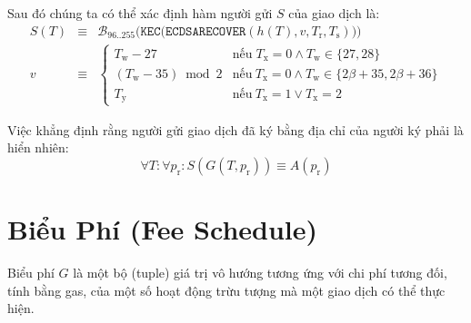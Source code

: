 \documentclass[9pt,oneside]{amsart}
\begin{document}
Sau đó chúng ta có thể xác định hàm người gửi $S$ của giao dịch là:
\begin{eqnarray}
S(T) &\equiv& \mathcal{B}_{96..255}\big(\mathtt{KEC}\big( \mathtt{ECDSARECOVER}(h(T), v, T_{\mathrm{r}}, T_{\mathrm{s}}) \big) \big) \\
v &\equiv& \begin{cases}
T_{\mathrm{w}} - 27 & \text{nếu} \; T_{\mathrm{x}} = 0 \land T_{\mathrm{w}} \in \{27, 28\} \\
(T_{\mathrm{w}}-35) \bmod 2 & \text{nếu} \ T_{\mathrm{x}} = 0 \land T_{\mathrm{w}} \in \{2\beta + 35, 2\beta + 36\} \\
T_{\mathrm{y}} & \text{nếu} \ T_{\mathrm{x}} = 1 \lor T_{\mathrm{x}} = 2
\end{cases}
\end{eqnarray}

Việc khẳng định rằng người gửi giao dịch đã ký bằng địa chỉ của người ký phải là hiển nhiên:
\begin{equation}
\forall T: \forall p_{\mathrm{r}}: S(G(T, p_{\mathrm{r}})) \equiv A(p_{\mathrm{r}})
\end{equation}

\section{Biểu Phí (Fee Schedule)}\label{app:fees}

\nopagebreak
Biểu phí $G$ là một bộ (tuple) giá trị vô hướng tương ứng với chi phí tương đối, tính bằng gas, của một số hoạt động trừu tượng mà một giao dịch có thể thực hiện.
\end{document}
